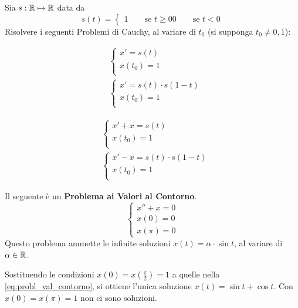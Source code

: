 \begin{exercise}
	Sia $s:\mathbb{R} \mapsto \mathbb{R}$ data da
	$$s(t) =
	\begin{cases}
		1 \qquad \text{se } t \geq 0
		0 \qquad \text{se } t < 0
	\end{cases}$$
	Risolvere i seguenti Problemi di Cauchy, al variare di $t_0$ (si supponga $t_0 \neq 0,1$):

	\begin{minipage}{0.5\linewidth}
		\begin{align*}
			&\begin{cases}
				x' = s(t)\\
				x(t_0) = 1\\
			\end{cases}\\
			&\begin{cases}
				x' = s(t) \cdot s(1-t)\\
				x(t_0) = 1\\
			\end{cases}
		\end{align*}
	\end{minipage}
	\begin{minipage}{0.5\linewidth}
		\begin{align*}
			&\begin{cases}
				x' + x = s(t)\\
				x(t_0) = 1\\
			\end{cases}\\
			&\begin{cases}
				x' - x = s(t) \cdot s(1-t)\\
				x(t_0) = 1\\
			\end{cases}
		\end{align*}
	\end{minipage}
\end{exercise}
\begin{example}
	Il seguente è un \textbf{Problema ai Valori al Contorno}.
	\begin{equation}
		\label{eq:probl_val_contorno}
		\begin{cases}
			x'' + x = 0\\
			x(0) = 0\\
			x(\pi) = 0
		\end{cases}
	\end{equation}
	Questo problema ammette le infinite soluzioni $x(t) = \alpha \cdot \sin t$, al variare di $\alpha \in \mathbb{R}$.

	Sostituendo le condizioni $x(0) = x(\frac{\pi}{2}) = 1$ a quelle nella \cref{eq:probl_val_contorno}, si ottiene l'unica soluzione $x(t) = \sin t + \cos t$. Con $x(0) = x(\pi) = 1$ non ci sono soluzioni.
\end{example}

